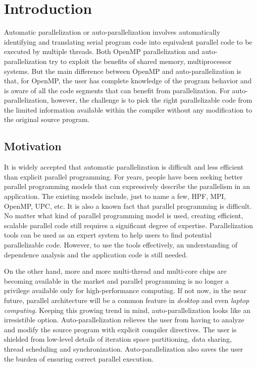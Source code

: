 \section{Introduction}
\label{introduction}

Automatic parallelization or auto-parallelization involves
automatically identifying and translating serial program code into
equivalent parallel code to be executed by multiple threads. Both
OpenMP parallelization and auto-parallelization try to exploit the
benefits of shared memory, multiprocessor systems. But the main
difference between OpenMP and auto-parallelization is that, for
OpenMP, the user has complete knowledge of the program behavior and is
aware of all the code segments that can benefit from parallelization.
For auto-parallelization, however, the challenge is to pick the right parallelizable code from the limited information available within the compiler without any modification to the original source program.

\subsection{Motivation}

It is widely accepted that automatic parallelization is difficult and
less efficient than explicit parallel programming. For years, people
have been seeking better parallel programming models that can
expressively describe the parallelism in an application. The existing
models include, just to name a few, HPF\cite{Koe93}, MPI\cite{Pac96},
OpenMP\cite{Cha01}, UPC\cite{ElG03}, etc. It is also a known fact that
parallel programming is difficult. No matter what kind of parallel
programming model is used, creating efficient, scalable parallel code
still requires a significant degree of expertise. Parallelization
tools can be used as an expert system to help users to find potential
parallelizable code. However, to use the tools effectively,
an understanding of dependence analysis and the application code is still needed.

On the other hand, more and more multi-thread and multi-core chips are
becoming available in the market and parallel programming is no longer
a privilege available only for high-performance computing. If not now,
in the near future, parallel architecture will be a common feature in
\emph{desktop} and even \emph{laptop computing}. Keeping this growing
trend in mind, auto-parallelization looks like an irresistible option.
Auto-parallelization relieves the user from having to analyze and
modify the source program with explicit compiler directives. The user
is shielded from low-level details of iteration space partitioning,
data sharing, thread scheduling and synchronization.
Auto-parallelization also saves the user the burden of ensuring
correct parallel execution.


